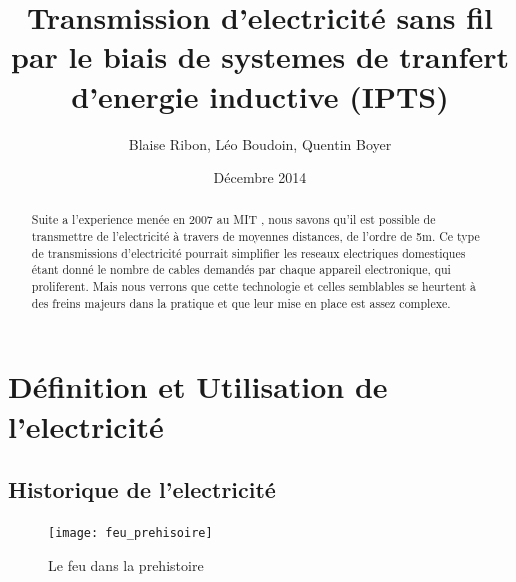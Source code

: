 \documentclass[11pt]{report}
\begin{document}

\title{Transmission d'electricité sans fil par le biais de systemes de tranfert d'energie inductive (IPTS)}
\author{Blaise Ribon, Léo Boudoin, Quentin Boyer}
\date{Décembre 2014}
\maketitle

\begin{abstract}
	Suite a l'experience menée en 2007 au MIT , nous savons qu'il est possible de transmettre de l'electricité à travers de moyennes distances, de l'ordre de 5m. Ce type de transmissions d'electricité pourrait simplifier les reseaux electriques domestiques étant donné le nombre de cables demandés par chaque appareil electronique, qui proliferent. Mais nous verrons que cette technologie et celles semblables se heurtent à des freins majeurs dans la pratique et que leur mise en place est assez complexe.
\end{abstract}

\tableofcontents

\chapter{Définition et Utilisation de l'electricité} %
\section{Historique de l'electricité}

\begin{figure}[h!]
  \caption{Le feu dans la prehistoire}
  \centering
	\texttt{[image: feu\_prehisoire]}
\end{figure}
\end{document}

